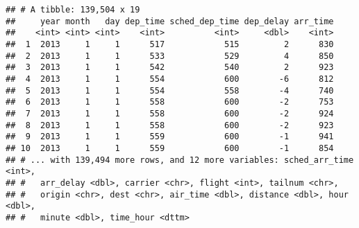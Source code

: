 \documentclass[]{article}
\newenvironment{Shaded}{\begin{snugshade}}{\end{snugshade}}
\newcommand{\KeywordTok}[1]{\textcolor[rgb]{0.13,0.29,0.53}{\textbf{#1}}}
\newcommand{\DecValTok}[1]{\textcolor[rgb]{0.00,0.00,0.81}{#1}}
\newcommand{\StringTok}[1]{\textcolor[rgb]{0.31,0.60,0.02}{#1}}
\newcommand{\CommentTok}[1]{\textcolor[rgb]{0.56,0.35,0.01}{\textit{#1}}}
\newcommand{\OperatorTok}[1]{\textcolor[rgb]{0.81,0.36,0.00}{\textbf{#1}}}
\newcommand{\NormalTok}[1]{#1}
\begin{document}
\begin{Shaded}
\end{Shaded}

\begin{verbatim}
## # A tibble: 139,504 x 19
##     year month   day dep_time sched_dep_time dep_delay arr_time
##    <int> <int> <int>    <int>          <int>     <dbl>    <int>
##  1  2013     1     1      517            515         2      830
##  2  2013     1     1      533            529         4      850
##  3  2013     1     1      542            540         2      923
##  4  2013     1     1      554            600        -6      812
##  5  2013     1     1      554            558        -4      740
##  6  2013     1     1      558            600        -2      753
##  7  2013     1     1      558            600        -2      924
##  8  2013     1     1      558            600        -2      923
##  9  2013     1     1      559            600        -1      941
## 10  2013     1     1      559            600        -1      854
## # ... with 139,494 more rows, and 12 more variables: sched_arr_time <int>,
## #   arr_delay <dbl>, carrier <chr>, flight <int>, tailnum <chr>,
## #   origin <chr>, dest <chr>, air_time <dbl>, distance <dbl>, hour <dbl>,
## #   minute <dbl>, time_hour <dttm>
\end{verbatim}

\begin{Shaded}
\end{Shaded}
\end{document}
